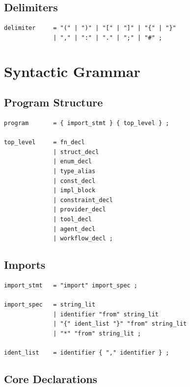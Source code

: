 \subsection{Delimiters}

\begin{lstlisting}[language=EBNF]
delimiter     = "(" | ")" | "[" | "]" | "{" | "}"
              | "," | ":" | "." | ";" | "#" ;
\end{lstlisting}

\section{Syntactic Grammar}

\subsection{Program Structure}

\begin{lstlisting}[language=EBNF]
program       = { import_stmt } { top_level } ;

top_level     = fn_decl
              | struct_decl
              | enum_decl
              | type_alias
              | const_decl
              | impl_block
              | constraint_decl
              | provider_decl
              | tool_decl
              | agent_decl
              | workflow_decl ;
\end{lstlisting}

\subsection{Imports}

\begin{lstlisting}[language=EBNF]
import_stmt   = "import" import_spec ;

import_spec   = string_lit
              | identifier "from" string_lit
              | "{" ident_list "}" "from" string_lit
              | "*" "from" string_lit ;

ident_list    = identifier { "," identifier } ;
\end{lstlisting}

\subsection{Core Declarations}


